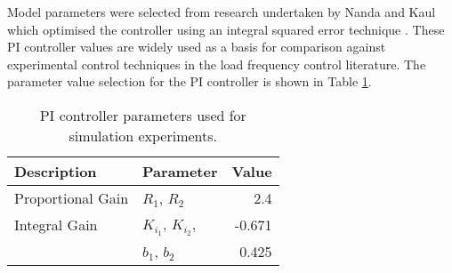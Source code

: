 Model parameters were selected from research undertaken by Nanda and Kaul which optimised the controller using an integral squared error technique \cite{Nanda1977}. These PI controller values are widely used as a basis for comparison against experimental control techniques in the load frequency control literature. The parameter value selection for the PI controller is shown in Table \ref{tab:5201}.

\begin{table}[h]
	\centering
	\caption[PI controller parameters]{PI controller parameters used for simulation experiments.}\label{tab:5201_pi_parameter_selection}
	\begin{tabular}{llr}
		\toprule
		\textbf{Description} & \textbf{Parameter} & \textbf{Value} \\
		\midrule
		Proportional Gain & $R_1$, $R_2$ & 2.4 \\
		Integral Gain & $K_{i_1}$, $K_{i_2}$, & -0.671 \\
		 & $b_1$, $b_2$ & 0.425 \\
		\bottomrule
	\end{tabular}\label{tab:5201}
\end{table} 